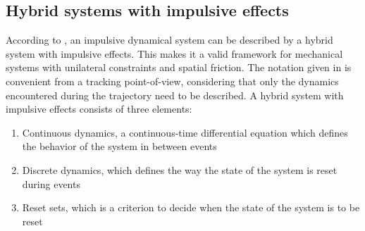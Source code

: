 \documentclass[../DC2017114Bouma.tex]{subfiles}
\begin{document}
%
\subsection{Hybrid systems with impulsive effects}\label{sec:2hyb}
According to \cite{Haddad2006}, an impulsive dynamical system can be described by a hybrid system with impulsive effects. This makes it a valid framework for mechanical systems with unilateral constraints and spatial friction. The notation given in \cite{Haddad2006} is convenient from a tracking point-of-view, considering that only the dynamics encountered during the trajectory need to be described. A hybrid system with impulsive effects consists of three elements:
\begin{enumerate}
\item Continuous dynamics, a continuous-time differential equation which defines the behavior of the system in between events
\item Discrete dynamics, which defines the way the state of the system is reset during events
\item Reset sets, which is a criterion to decide when the state of the system is to be reset
\end{enumerate}
\end{document}
